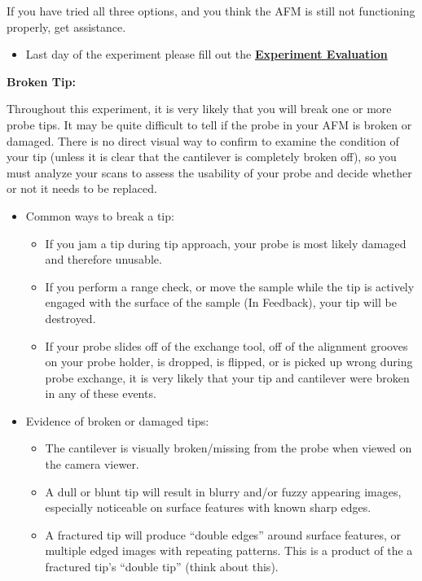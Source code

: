 \documentclass{../lab}
\begin{document}
If you have tried all three options, and you think the AFM is still not functioning properly, get assistance.

\begin{itemize}
    \item Last day of the experiment please fill out the \href{\ExperimentEvaluation}{\textbf{Experiment Evaluation}}

\end{itemize}

\textbf{Broken Tip:}

Throughout this experiment, it is very likely that you will break one or more probe tips.  It may be quite difficult to tell if the probe in your AFM is broken or damaged.  There is no direct visual way to confirm to examine the condition of your tip (unless it is clear that the cantilever is completely broken off), so you must analyze your scans to assess the usability of your probe and decide whether or not it needs to be replaced.

\begin{itemize}
    \item Common ways to break a tip:

    \begin{itemize}
        \item If you jam a tip during tip approach, your probe is most likely damaged and therefore unusable.

        \item If you perform a range check, or move the sample while the tip is actively engaged with the surface of the sample (In Feedback), your tip will be destroyed.

        \item If your probe slides off of the exchange tool, off of the alignment grooves on your probe holder, is dropped, is flipped, or is picked up wrong during probe exchange, it is very likely that your tip and cantilever were broken in any of these events.

    \end{itemize}

    \item Evidence of broken or damaged tips:

    \begin{itemize}
        \item The cantilever is visually broken/missing from the probe when viewed on the camera viewer.

        \item A dull or blunt tip will result in blurry and/or fuzzy appearing images, especially noticeable on surface features with known sharp edges.

        \item A fractured tip will produce ``double edges'' around surface features, or multiple edged images with repeating patterns.  This is a product of the a fractured tip's ``double tip'' (think about this).

    \end{itemize}

\end{itemize}
\end{document}
